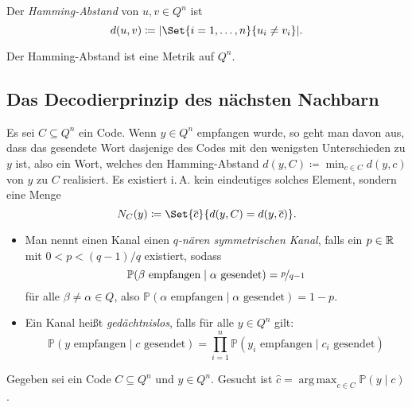 \documentclass{cheat-sheet}
\renewcommand{\P}{\mathbb{P}} %
\newcommand{\CP}[2]{\P({#1}\mid{#2})} %
\DeclareMathOperator*{\argmax}{arg\,max}
\begin{document}
\begin{samepage}

\begin{defn}
  Der \emph{Hamming-Abstand} von $u, v \in Q^n$ ist
  \[ d(u, v) \coloneqq \abs{\Set{i=1,\ldots,n}{u_i \neq v_i}}. \]
\end{defn}

\begin{lem}
  Der Hamming-Abstand ist eine Metrik auf $Q^n$.
\end{lem}

\subsection{Das Decodierprinzip des nächsten Nachbarn}

\end{samepage}

\begin{nota}
  Es sei $C \subseteq Q^n$ ein Code.
  Wenn $y \in Q^n$ empfangen wurde, so geht man davon aus, dass das gesendete Wort dasjenige des Codes mit den wenigsten Unterschieden zu $y$ ist, also ein Wort, welches den Hamming-Abstand $d(y, C) \coloneqq {\min}_{c \in C} d(y, c)$ von $y$ zu $C$ realisiert.
  Es existiert i.\,A. kein eindeutiges solches Element, sondern eine Menge
  \[ N_C(y) \coloneqq \Set{\overline{c}}{d(y, C) = d(y, \overline{c})}. \]
\end{nota}

\begin{defn}
  \begin{itemize}
    \item Man nennt einen Kanal einen \emph{$q$-nären symmetrischen Kanal}, falls ein $p \in \mathbb{R}$ mit $0 < p < (q-1)/q$ existiert, sodass
    \[ \CP{\text{$\beta$ empfangen}}{\text{$\alpha$ gesendet}} = \nicefrac{p}{q-1} \]
    für alle $\beta \neq \alpha \in Q$, also $\CP{\text{$\alpha$ empfangen}}{\text{$\alpha$ gesendet}} = 1-p$.
    \item Ein Kanal heißt \emph{gedächtnislos}, falls für alle $y \in Q^n$ gilt:
    \[ \CP{\text{$y$ empfangen}}{\text{$c$ gesendet}} = \prod_{i=1}^n \CP{\text{$y_i$ empfangen}}{\text{$c_i$ gesendet}} \]
  \end{itemize}
\end{defn}

\begin{defn}
  Gegeben sei ein Code $C \subseteq Q^n$ und $y \in Q^n$.
  Gesucht ist $\hat{c} = {\argmax}_{c \in C} \CP{y}{c}$.
\end{defn}
\end{document}
